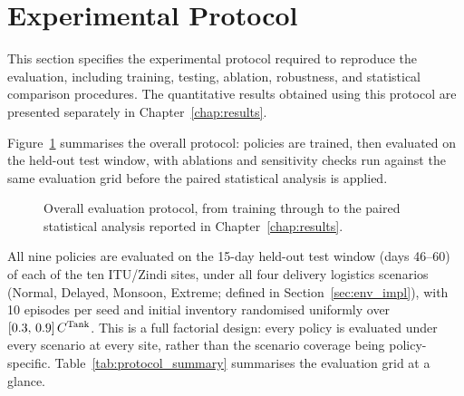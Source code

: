 \section{Experimental Protocol}
\label{sec:evaluation_protocol}
This section specifies the experimental protocol required to reproduce
the evaluation, including training, testing, ablation, robustness, and
statistical comparison procedures. The quantitative results obtained
using this protocol are presented separately in
Chapter~\ref{chap:results}.

Figure~\ref{fig:eval_flow} summarises the overall protocol: policies are
trained, then evaluated on the held-out test window, with ablations and
sensitivity checks run against the same evaluation grid before the
paired statistical analysis is applied.

\begin{figure}[htbp]
\centering
{}
\caption{Overall evaluation protocol, from training through to the
paired statistical analysis reported in Chapter~\ref{chap:results}.}
\label{fig:eval_flow}
\end{figure}

All nine policies are evaluated on the 15-day held-out test window (days
46--60) of each of the ten ITU/Zindi sites, under all four delivery
logistics scenarios (Normal, Delayed, Monsoon, Extreme; defined in
Section~\ref{sec:env_impl}), with 10 episodes per seed and initial
inventory randomised uniformly over $[0.3,\,0.9]\,C^{\mathrm{Tank}}$. This is a
full factorial design: every policy is evaluated under every scenario at
every site, rather than the scenario coverage being policy-specific.
Table~\ref{tab:protocol_summary} summarises the evaluation grid at a
glance.

